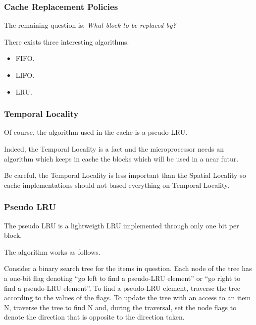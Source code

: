 \begin{frame}
  \frametitle{Cache Replacement Policies}

  The remaining question is: \textit{What block to be replaced by?}

  \-

  There exists three interesting algorithms:

  \begin{itemize}[<+->]
    \item
      FIFO.
    \item
      LIFO.
    \item
      LRU.
  \end{itemize}
\end{frame}


\begin{frame}
  \frametitle{Temporal Locality}

  Of course, the algorithm used in the cache is a pseudo LRU.

  \-

  Indeed, the Temporal Locality is a fact and the microprocessor needs
  an algorithm which keeps in cache the blocks which will be used in a near
  futur.

  \-

  Be careful, the Temporal Locality is less important than the Spatial
  Locality so cache implementations should not based everything on
  Temporal Locality.

  \begin{center}
  \end{center}
\end{frame}


\begin{frame}
  \frametitle{Pseudo LRU}

  The pseudo LRU is a lightweigth LRU implemented through only one bit
  per block.

  \-

  The algorithm works as follows.

  \-

  Consider a binary search tree for the items in question. Each node of
  the tree has a one-bit flag denoting ``go left to find a pseudo-LRU element''
  or ``go right to find a pseudo-LRU element''. To find a pseudo-LRU element,
  traverse the tree according to the values of the flags. To update the
  tree with an access to an item N, traverse the tree to find N and, during
  the traversal, set the node flags to denote the direction that is opposite
  to the direction taken.
\end{frame}


